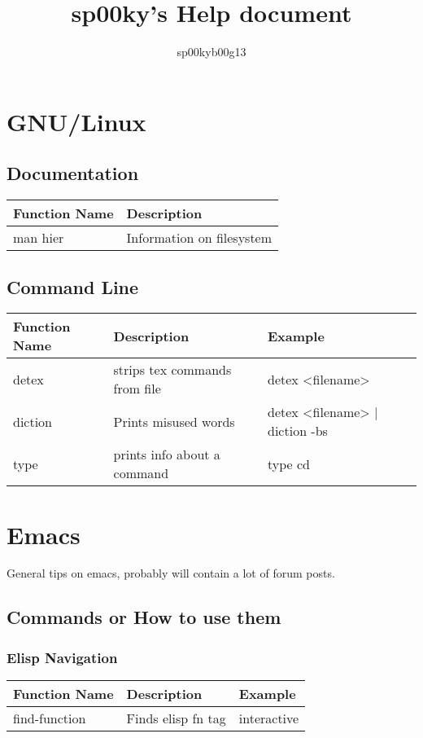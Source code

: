 \documentclass[12pt, letterpaper]{article}
\title{sp00ky's Help document}
\author{sp00kyb00g13}
\begin{document}
\begin{titlepage}
\maketitle
\end{titlepage}

\tableofcontents
\clearpage

\section{GNU/Linux}
\subsection{Documentation}
\begin{tabular} {|L{0.2\textwidth}|L{0.8\textwidth}|}
  \hline
  \textbf{Function Name} &
  \textbf{Description} \\\hline\hline
  man hier & Information on filesystem \\\hline

\end{tabular}

\subsection{Command Line}
\begin{tabular} {|L{0.2\textwidth}|L{0.4\textwidth}|L{0.4\textwidth}|}
  \hline
  \textbf{Function Name} &
  \textbf{Description} &
  \textbf{Example} \\\hline\hline
  detex & strips tex commands from file & detex <filename> \\\hline
  diction & Prints misused words & detex <filename> | diction -bs \\\hline
  type & prints info about a command & type cd \\\hline

\end{tabular}

\section{Emacs}
General tips on emacs, probably will contain a lot of forum posts.
\subsection{Commands or How to use them}
\subsubsection{Elisp Navigation}
\begin{tabular} {|L{0.2\textwidth}|L{0.4\textwidth}|L{0.4\textwidth}|}
  \hline
  \textbf{Function Name} &
  \textbf{Description} &
  \textbf{Example} \\\hline\hline
  find-function & Finds elisp fn tag & interactive \\\hline
\end{tabular}
\end{document}
